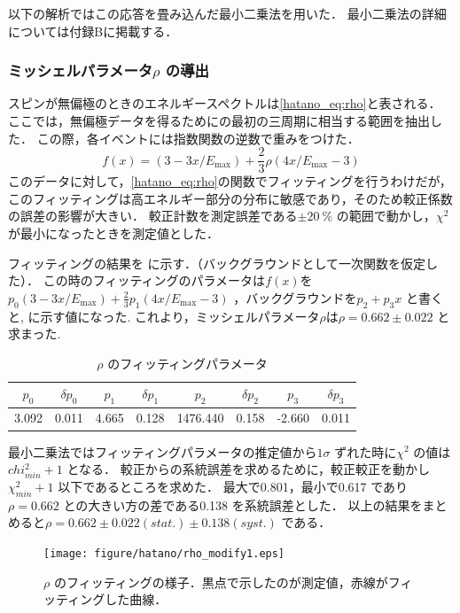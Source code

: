 以下の解析ではこの応答を畳み込んだ最小二乗法を用いた．
最小二乗法の詳細については付録Bに掲載する．

\subsubsection{ミッシェルパラメータ$\rho$ の導出}
スピンが無偏極のときのエネルギースペクトルは\eqref{hatano_eq:rho}と表される．
ここでは，無偏極データを得るためにの最初の三周期に相当する範囲を抽出した．
この際，各イベントには指数関数の逆数で重みをつけた．
\begin{equation}
  f(x)=(3 - 3x / E_\mathrm{max})+\frac{2}{3}\rho(4x / E_\mathrm{max} - 3)
  \label{hatano_eq:rho}
\end{equation}
このデータに対して，\eqref{hatano_eq:rho}の関数でフィッティングを行うわけだが，このフィッティングは高エネルギー部分の分布に敏感であり，そのため較正係数の誤差の影響が大きい．
較正計数を測定誤差である$\pm 20~\%$ の範囲で動かし，$\chi^2$ が最小になったときを測定値とした．

フィッティングの結果を に示す．（バックグラウンドとして一次関数を仮定した）．
この時のフィッティングのパラメータは$f(x)$を$p_0(3 - 3x / E_\mathrm{max}) + \frac{2}{3} p_{1} (4x / E_\mathrm{max} - 3)$ ，バックグラウンドを$p_2+p_3x$ と書くと, に示す値になった.
これより，ミッシェルパラメータ$\rho$は$\rho=0.662 \pm 0.022$ と求まった.

\begin{table}[hbt]
\centering
\caption{$\rho$ のフィッティングパラメータ}
\begin{tabular}{cc|cc|cc|cc}
$p_0$ & $\delta p_0$ & $p_1$ & $\delta p_1$ & $p_2$ & $\delta p_2$ & $p_3$ & $\delta p_3$ \\ \hline
3.092 & 0.011 & 4.665 & 0.128 & 1476.440 & 0.158 & -2.660 & 0.011
\end{tabular}
\label{hatano_tab:rho}
\end{table}

最小二乗法ではフィッティングパラメータの推定値から$1\sigma$ ずれた時に$\chi^2$ の値は$chi^2_{min}+1$ となる．\cite{leo} 
較正からの系統誤差を求めるために，較正較正を動かし$\chi^{2}_{min} + 1$ 以下であるところを求めた．
最大で0.801，最小で0.617 であり$\rho=0.662$ との大きい方の差である0.138 を系統誤差とした．
以上の結果をまとめると$\rho=0.662 \pm 0.022 (stat.) \pm 0.138 (syst.)$ である．

\begin{figure}[hbt]
\centering
\texttt{[image: figure/hatano/rho\_modify1.eps]}
\caption{$\rho$ のフィッティングの様子．黒点で示したのが測定値，赤線がフィッティングした曲線．}
\label{hatano_fig:rho}
\end{figure}

